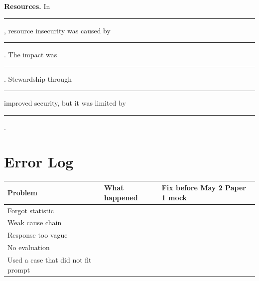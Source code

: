 \documentclass[11pt,a4paper]{article}
\begin{document}
\vspace{0.55em}

\noindent\colorbox{SoftBlue}{%
\begin{minipage}{0.965\textwidth}
\sffamily
\textbf{\textcolor{HeadingBlue}{Resources.}}
In \rule{0.18\textwidth}{0.4pt}, resource insecurity was caused by
\rule{0.25\textwidth}{0.4pt}. The impact was
\rule{0.25\textwidth}{0.4pt}. Stewardship through
\rule{0.22\textwidth}{0.4pt} improved security, but it was limited by
\rule{0.25\textwidth}{0.4pt}.
\end{minipage}
}

\section{Error Log}

\begin{tabularx}{\textwidth}{L{0.22\textwidth}Y Y}
\toprule
\textbf{Problem} & \textbf{What happened} & \textbf{Fix before May 2 Paper 1 mock} \\
\midrule
Forgot statistic & & \\
Weak cause chain & & \\
Response too vague & & \\
No evaluation & & \\
Used a case that did not fit prompt & & \\
\bottomrule
\end{tabularx}
\end{document}
